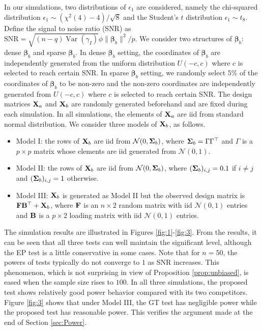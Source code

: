 \documentclass[bj]{imsart}
\DeclareMathOperator{\myVar}{Var}
\newcommand{\bfsym}[1]{\ensuremath{\boldsymbol{#1}}}
\def\bbeta{\bfsym \beta}
\theoremstyle{plain}
\theoremstyle{definition}
\theoremstyle{remark}
\begin{document}
In our simulations, two distributions of $\epsilon_1$ are considered, namely the chi-squared distribution \mbox{$\epsilon_1 \sim (\chi^2(4)-4)/\sqrt 8$} and the Student's $t$ distribution $\epsilon_1 \sim t_8$.
Define the signal to noise ratio (SNR) as $\text{SNR}=\sqrt{(n-q)\myVar (\gamma_I)} \phi \|\bbeta_b\|^2/p$.
We consider two structures of $\bbeta_b$: dense $\bbeta_b$ and sparse $\bbeta_b$.
In dense $\bbeta_b$ setting, the coordinates of $\bbeta_b$ are independently generated from the uniform distribution $U(-c, c)$ where $c$ is selected to reach certain SNR.
In sparse $\bbeta_b$ setting, we randomly select $5\%$ of the coordinates of $\bbeta_b$ to be non-zero and the non-zero coordinates are independently generated from $U(-c,c)$ where $c$ is selected to reach certain SNR.
The design matrices $\mathbf{X}_a$ and $\mathbf{X}_b$ are randomly generated beforehand and are fixed during each simulation.
In all simulations, the elements of $\mathbf{X}_a$ are iid from standard normal distribution.
We consider three models of $\mathbf{X}_b$, as follows.
\begin{itemize}
    \item Model I: the rows of $\mathbf{X}_b$ are iid from $\mathcal N(0,\bSigma_b)$, where $\bSigma_b =\Gamma \Gamma^\top$ and $\Gamma$ is a $p\times p$ matrix whose elements are iid generated from $\mathcal N(0,1)$.
        \item
            Model II: the rows of $\mathbf{X}_b$ are iid from $\mathcal N(0,\bSigma_b)$, where $(\bSigma_b)_{i,j}=0.1$ if $i\neq j$ and $(\bSigma_b)_{i,j}=1$ otherwise.
        \item
            Model III: $\mathbf{X}_b$ is generated as Model II but the observed design matrix is $\mathbf{F}\mathbf{B}^\top+\mathbf{X}_b$, where $\mathbf{F}$ is an $n \times 2$ random matrix with iid $\mathcal N(0,1)$ entries and $\mathbf{B}$ is a $p \times 2$ loading matrix with iid $\mathcal N(0,1)$ entries.
\end{itemize}
The simulation results are illustrated in Figures \ref{fig:1}-\ref{fig:3}.
From the results, it can be seen that all three tests can well maintain the significant level, although the EP test is a little conservative in some cases.
Note that for $n =50$, the powers of tests typically do not converge to $1$ as SNR increases.
This phenomenon, which is not surprising in view of Proposition \ref{prop:unbiased}, is eased when the sample size rises to $100$.
In all three simulations, the proposed test shows relatively good power behavior compared with its two competitors.
Figure \ref{fig:3} shows that under Model III, the GT test has negligible power while the proposed test has reasonable power.
This verifies the argument made at the end of Section \ref{sec:Power}.
\end{document}
